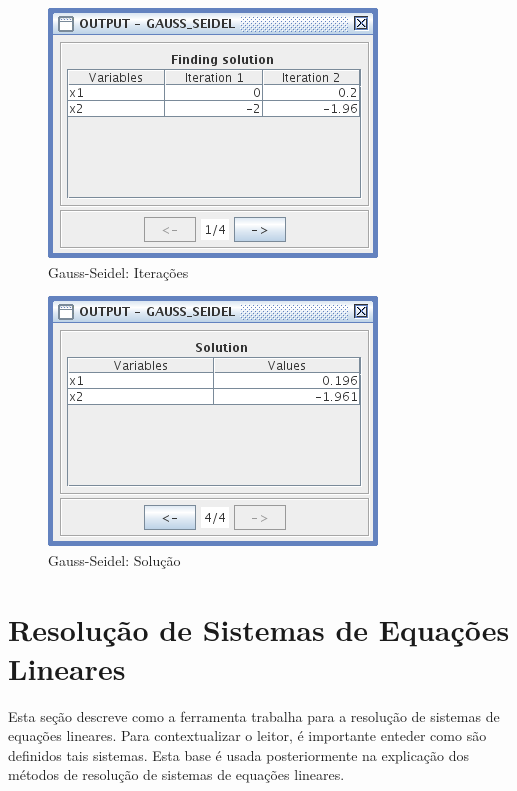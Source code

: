 \documentclass[a4paper,10pt]{report}
\begin{document}
\begin{figure}[ht]
 \centering
 \includegraphics[scale=0.8, bb=0 0 222 168]{screen-E-seidel-finding.png}
 \caption{Gauss-Seidel: Iterações}
 \label{fig:seidelfinding}
\end{figure}

\begin{figure}[ht]
 \centering
 \includegraphics[scale=0.8, bb=0 0 222 168]{screen-F-seidel-solution.png}
 \caption{Gauss-Seidel: Solução}
 \label{fig:seidelsolution}
\end{figure}


\chapter{Resolução de Sistemas de Equações Lineares}
\label{resolucao}
Esta seção descreve como a ferramenta trabalha para a resolução de sistemas de equações lineares. Para contextualizar o leitor, é importante enteder como são definidos tais sistemas. Esta base é usada posteriormente na explicação dos métodos de resolução de sistemas de equações lineares.
\end{document}
